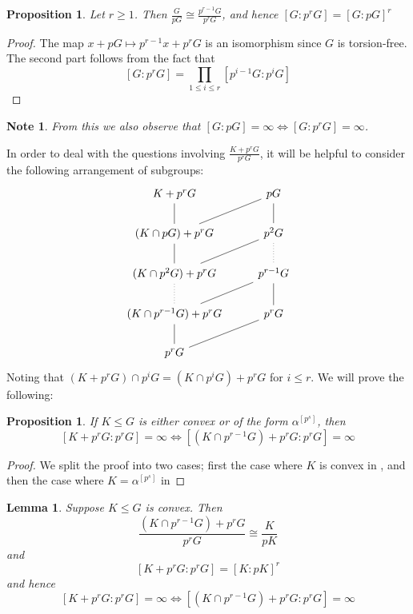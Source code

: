\documentclass[a4paper,11pt]{article}
\newtheorem{proposition}[theorem]{Proposition}
\newtheorem{lemma}[theorem]{Lemma}
\newtheorem*{note}{Note}
\renewcommand{\iff}{\Longleftrightarrow}
\begin{document}
\begin{proposition}\label{infiniterightquotientsconvex}
	Let $r\geq 1$. Then $\frac{G}{pG}\cong\frac{p^{r-1}G}{p^rG}$, and hence $[G:p^rG]=[G:pG]^r$
\end{proposition}
\begin{proof}
	The map $x+pG\mapsto p^{r-1}x+p^rG$ is an isomorphism since $G$ is torsion-free. The second part follows from the fact that $$[G:p^rG]=\prod\limits_{1\leq i \leq r}[p^{i-1}G:p^iG]$$
\end{proof}
\begin{note}
	From this we also observe that $[G:pG] = \infty \iff [G:p^rG] = \infty$.
\end{note}

\noindent In order to deal with the questions involving $\frac{K+p^rG}{p^rG}$, it will be helpful to consider the following arrangement of subgroups:
\[\begin{tikzcd}
	{K+p^rG} & {pG} \\
	{(K\cap pG) +p^rG} & {p^2G} \\
	{(K\cap p^2G) +p^rG} & {p^{r-1}G} \\
	{(K\cap p^{r-1}G)+p^rG} & {p^rG} \\
	{p^rG}
	\arrow[no head, from=1-1, to=2-1]
	\arrow[no head, from=1-2, to=2-1]
	\arrow[no head, from=1-2, to=2-2]
	\arrow[no head, from=2-1, to=3-1]
	\arrow[no head, from=2-2, to=3-1]
	\arrow[dotted, no head, from=2-2, to=3-2]
	\arrow[dotted, no head, from=3-1, to=4-1]
	\arrow[no head, from=3-2, to=4-1]
	\arrow[no head, from=3-2, to=4-2]
	\arrow[no head, from=4-1, to=5-1]
	\arrow[no head, from=4-2, to=5-1]
\end{tikzcd}\]
Noting that $(K+p^rG)\cap p^iG =  (K\cap p^iG)+p^rG$ for $i\leq r$. We will prove the following:
\begin{proposition}\label{DescendingInfiniteQuotients}
	If $K\leq G$ is either convex or of the form $\alpha^{[p^s]}$, then
	$$[K+p^rG:p^rG]=\infty \iff [(K\cap p^{r-1}G)+p^rG:p^rG] = \infty$$
\end{proposition}
\begin{proof}
    We split the proof into two cases; first the case where $K$ is convex in , and then the case where $K=\alpha^{[p^s]}$ in 
\end{proof}
\begin{lemma}\label{leftconvexrelationship}
	Suppose $ K \leq G$ is convex. Then $$\frac{(K\cap p^{r-1}G) + p^rG}{p^rG}\cong\frac{K}{pK}$$ and $$[K+p^rG:p^rG]= [K:pK]^r$$ and hence $$[K+p^rG:p^rG]=\infty \iff [(K\cap p^{r-1}G)+p^rG:p^rG] = \infty$$
\end{lemma}
\end{document}
